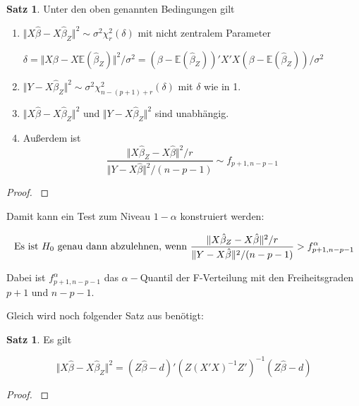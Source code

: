 \documentclass[12pt,a4paper]{article}
\theoremstyle{definition}
\theoremstyle{definition}
\newtheorem{Satz}[Definition]{Satz}
\theoremstyle{definition}
\theoremstyle{definition}
\begin{document}
\begin{Satz}
Unter den oben genannten Bedingungen gilt
\begin{enumerate}
\item $\Vert X \hat{\beta} - X\hat{\beta}_Z \Vert^2  \sim \sigma^2 \chi_r^2(\delta)$ mit nicht zentralem Parameter 

$\delta = \Vert X \beta - X \mathbb{E}(\hat{\beta}_Z) \Vert^2 / \sigma^2 = (\beta - \mathbb{E}(\hat{\beta}_Z))' X'X (\beta - \mathbb{E}(\hat{\beta}_Z)) / \sigma^2$
\item $\Vert Y - X \hat{\beta}_Z \Vert^2  \sim \sigma^2 \chi_{n-(p+1)+r}^2(\delta)$ mit $\delta$ wie in 1.
\item $\Vert X \hat{\beta} - X\hat{\beta}_Z \Vert^2$ und $\Vert Y - X \hat{\beta}_Z \Vert^2$ sind unabhängig.
\item Außerdem ist
\begin{equation*}
\frac{\Vert X \hat{\beta}_Z - X\hat{\beta} \Vert^2 / r}{\Vert Y - X \hat{\beta} \Vert^2 / (n-p-1)} \sim f_{p+1,n-p-1}
\end{equation*}
\end{enumerate}
\end{Satz}

\begin{proof}
\cite[11]{Liu64}
\end{proof}

Damit kann ein Test zum Niveau $1-\alpha$ konstruiert werden:

\begin{equation}
\textnormal{Es ist }  H_0 \textnormal{ genau dann abzulehnen, wenn } \frac{\Vert X \hat{\beta}_Z - X\hat{\beta} \Vert^2 / r}{\Vert Y - X \hat{\beta} \Vert^2 / (n-p-1)} > f_{p+1,n-p-1}^{\alpha} \label{Einschränkung_Test}
\end{equation}

Dabei ist $f_{p+1,n-p-1}^{\alpha}$ das $\alpha-$Quantil der F-Verteilung mit den Freiheitsgraden $p+1$ und $n-p-1$.

Gleich wird noch folgender Satz aus \cite[13]{Liu64} benötigt:

\begin{Satz}
Es gilt 

\begin{equation*}
\Vert X \hat{\beta} - X \hat{\beta}_Z \Vert^2 = (Z \hat{\beta}-d)'(Z (X'X)^{-1} Z')^{-1} (Z \hat{\beta} - d)
\end{equation*}
\end{Satz}

\begin{proof}
\cite[13]{Liu64}
\end{proof}
\end{document}
